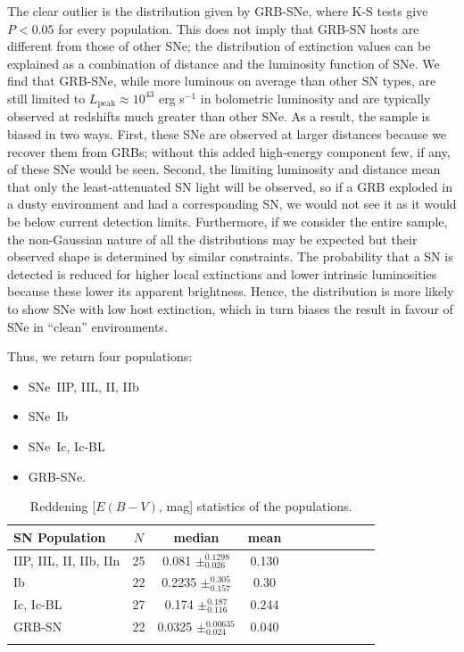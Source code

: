 \documentclass[a4paper,fleqn,usenatbib]{mnras}
\begin{document}
The clear outlier is the distribution given by GRB-SNe, where K-S tests give $P<0.05$ for every population. This does not imply that GRB-SN hosts are different from those of other SNe; the distribution of extinction values can be explained as a combination of distance and the luminosity function of SNe. We find that GRB-SNe, while more luminous on average than other SN types, are still limited to $L_{\mathrm{peak}} \approx 10^{43}$ erg s$^{-1}$ in bolometric luminosity and are typically observed at redshifts much greater than other SNe. As a result, the sample is biased in two ways. First, these SNe are observed at larger distances because we recover them from GRBs; without this added high-energy component few, if any, of these SNe would be seen. Second, the limiting luminosity and distance mean that only the least-attenuated SN light will be observed, so if a GRB exploded in a dusty environment and had a corresponding SN, we would not see it as it would be below current detection limits. Furthermore, if we consider the entire sample, the non-Gaussian nature of all the distributions may be expected but their observed shape is determined by similar constraints. The probability that a SN is detected is reduced for higher local extinctions and lower intrinsic luminosities because these lower its apparent brightness. Hence, the distribution is more likely to show SNe with low host extinction, which in turn biases the result in favour of SNe in ``clean'' environments. 

Thus, we return four populations:
\begin{itemize}
	\item{SNe~IIP, IIL, II, IIb}
	\item{SNe~Ib}
	\item{SNe~Ic, Ic-BL}
	\item{GRB-SNe}.
\end{itemize}

\begin{table}
 \centering
 \renewcommand{\arraystretch}{1.5}
 \begin{minipage}{100mm}
  \caption{Reddening [$E(B-V)$, mag] statistics of the populations. }
 \begin{tabular}{@{}lccccccclcc@{}}
  \hline
 SN Population & $N$ & median & mean  \\
  \hline
IIP, IIL, II, IIb, IIn& 25 & 0.081 $\pm_{0.026}^{0.1298}$& 0.130\\
Ib & 22 & 0.2235	 $\pm_{0.157}^{0.305}$ & 0.30  \\
Ic, Ic-BL & 27 & 0.174 $\pm_{0.116}^{0.187}$ &	0.244 \\
GRB-SN & 22& 0.0325 $\pm_{0.024}^{0.00635}$ & 0.040  \\
\hline
 \label{redstats}
\end{tabular}
\end{minipage}
\end{table}
\end{document}
